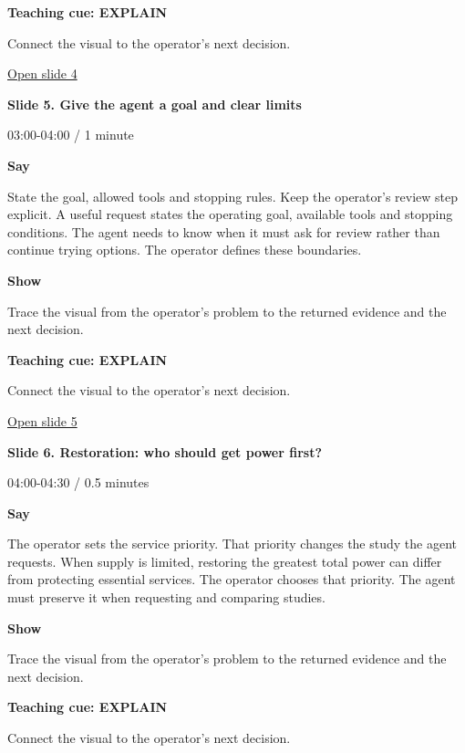 \documentclass[12pt,letterpaper]{article}
\begin{document}
\textbf{Teaching cue: EXPLAIN}\par Connect the visual to the operator's next decision.\par\medskip
\vfill\href{https://alaaselim-sudo.github.io/GridGuard-Agentic-AI-Tutorials/operator-cases/#/4}{Open slide 4}\par
\clearpage{}
{\Large\bfseries\color{IEEEBlue} Slide 5. Give the agent a goal and clear limits\par}\medskip
{\small\color{Slate} 03:00-04:00 /\allowbreak{} 1 minute\par}\medskip
\textbf{Say}\par State the goal, allowed tools and stopping rules. Keep the operator's review step explicit. A useful request states the operating goal, available tools and stopping conditions. The agent needs to know when it must ask for review rather than continue trying options. The operator defines these boundaries.\par\medskip
\textbf{Show}\par Trace the visual from the operator's problem to the returned evidence and the next decision.\par\medskip
\textbf{Teaching cue: EXPLAIN}\par Connect the visual to the operator's next decision.\par\medskip
\vfill\href{https://alaaselim-sudo.github.io/GridGuard-Agentic-AI-Tutorials/operator-cases/#/5}{Open slide 5}\par
\clearpage{}
{\Large\bfseries\color{IEEEBlue} Slide 6. Restoration: who should get power first?\par}\medskip
{\small\color{Slate} 04:00-04:30 /\allowbreak{} 0.5 minutes\par}\medskip
\textbf{Say}\par The operator sets the service priority. That priority changes the study the agent requests. When supply is limited, restoring the greatest total power can differ from protecting essential services. The operator chooses that priority. The agent must preserve it when requesting and comparing studies.\par\medskip
\textbf{Show}\par Trace the visual from the operator's problem to the returned evidence and the next decision.\par\medskip
\textbf{Teaching cue: EXPLAIN}\par Connect the visual to the operator's next decision.\par\medskip
\end{document}
